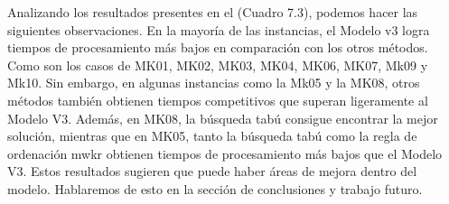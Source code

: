 Analizando los resultados presentes en el (Cuadro 7.3), podemos hacer las siguientes observaciones. En la mayoría de 
las instancias, el Modelo v3 logra tiempos de procesamiento más bajos en comparación con 
los otros métodos. Como son los casos de MK01, MK02, MK03, MK04, MK06, MK07, Mk09 y Mk10.
Sin embargo, en algunas instancias como la Mk05 y la MK08, otros métodos también obtienen 
tiempos competitivos que superan ligeramente al Modelo V3. Además, en MK08, la búsqueda tabú 
consigue encontrar la mejor solución, mientras que en MK05, tanto la búsqueda tabú como la
regla de ordenación mwkr obtienen tiempos de procesamiento más bajos que el Modelo V3.
Estos resultados sugieren que puede haber áreas de mejora dentro del modelo. Hablaremos
de esto en la sección de conclusiones y trabajo futuro.